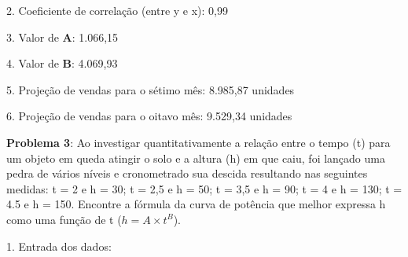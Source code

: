 2. Coeficiente de correlação (entre y e x): 0,99 \\
  

3. Valor de \textbf{A}: 1.066,15 \\
    

4. Valor de \textbf{B}: 4.069,93 \\
         \keystroke{$-$}

5. Projeção de vendas para o sétimo mês: 8.985,87 unidades \\
     

6. Projeção de vendas para o oitavo mês: 9.529,34 unidades \\
     

\textbf{Problema 3}: Ao investigar quantitativamente a relação entre o tempo (t) para um objeto em queda atingir o solo e a altura (h) em que caiu, foi lançado uma pedra de vários níveis e cronometrado sua descida resultando nas seguintes medidas: t = 2 e h = 30; t = 2,5 e h = 50; t = 3,5 e h = 90; t = 4 e h = 130; t = 4.5 e h = 150. Encontre a fórmula da curva de potência que melhor expressa h como uma função de t ($h = A \times t^B$).

1. Entrada dos dados: \\
  \\
   
   \keystroke{$\sum+$} \\
   
     \keystroke{$\sum+$} \\
   
     \keystroke{$\sum+$} \\
    
   \keystroke{$\sum+$} \\
     
     \keystroke{$\sum+$}

